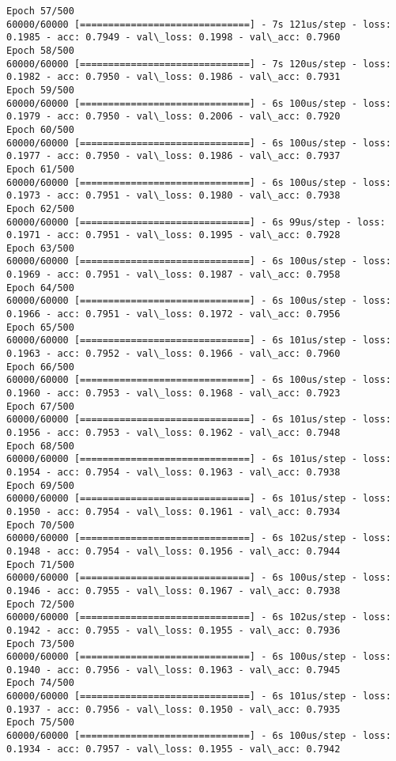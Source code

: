 \documentclass[11pt]{article}
\begin{document}
\begin{Verbatim}[commandchars=\\\{\}]
Epoch 57/500
60000/60000 [==============================] - 7s 121us/step - loss: 0.1985 - acc: 0.7949 - val\_loss: 0.1998 - val\_acc: 0.7960
Epoch 58/500
60000/60000 [==============================] - 7s 120us/step - loss: 0.1982 - acc: 0.7950 - val\_loss: 0.1986 - val\_acc: 0.7931
Epoch 59/500
60000/60000 [==============================] - 6s 100us/step - loss: 0.1979 - acc: 0.7950 - val\_loss: 0.2006 - val\_acc: 0.7920
Epoch 60/500
60000/60000 [==============================] - 6s 100us/step - loss: 0.1977 - acc: 0.7950 - val\_loss: 0.1986 - val\_acc: 0.7937
Epoch 61/500
60000/60000 [==============================] - 6s 100us/step - loss: 0.1973 - acc: 0.7951 - val\_loss: 0.1980 - val\_acc: 0.7938
Epoch 62/500
60000/60000 [==============================] - 6s 99us/step - loss: 0.1971 - acc: 0.7951 - val\_loss: 0.1995 - val\_acc: 0.7928
Epoch 63/500
60000/60000 [==============================] - 6s 100us/step - loss: 0.1969 - acc: 0.7951 - val\_loss: 0.1987 - val\_acc: 0.7958
Epoch 64/500
60000/60000 [==============================] - 6s 100us/step - loss: 0.1966 - acc: 0.7951 - val\_loss: 0.1972 - val\_acc: 0.7956
Epoch 65/500
60000/60000 [==============================] - 6s 101us/step - loss: 0.1963 - acc: 0.7952 - val\_loss: 0.1966 - val\_acc: 0.7960
Epoch 66/500
60000/60000 [==============================] - 6s 100us/step - loss: 0.1960 - acc: 0.7953 - val\_loss: 0.1968 - val\_acc: 0.7923
Epoch 67/500
60000/60000 [==============================] - 6s 101us/step - loss: 0.1956 - acc: 0.7953 - val\_loss: 0.1962 - val\_acc: 0.7948
Epoch 68/500
60000/60000 [==============================] - 6s 101us/step - loss: 0.1954 - acc: 0.7954 - val\_loss: 0.1963 - val\_acc: 0.7938
Epoch 69/500
60000/60000 [==============================] - 6s 101us/step - loss: 0.1950 - acc: 0.7954 - val\_loss: 0.1961 - val\_acc: 0.7934
Epoch 70/500
60000/60000 [==============================] - 6s 102us/step - loss: 0.1948 - acc: 0.7954 - val\_loss: 0.1956 - val\_acc: 0.7944
Epoch 71/500
60000/60000 [==============================] - 6s 100us/step - loss: 0.1946 - acc: 0.7955 - val\_loss: 0.1967 - val\_acc: 0.7938
Epoch 72/500
60000/60000 [==============================] - 6s 102us/step - loss: 0.1942 - acc: 0.7955 - val\_loss: 0.1955 - val\_acc: 0.7936
Epoch 73/500
60000/60000 [==============================] - 6s 100us/step - loss: 0.1940 - acc: 0.7956 - val\_loss: 0.1963 - val\_acc: 0.7945
Epoch 74/500
60000/60000 [==============================] - 6s 101us/step - loss: 0.1937 - acc: 0.7956 - val\_loss: 0.1950 - val\_acc: 0.7935
Epoch 75/500
60000/60000 [==============================] - 6s 100us/step - loss: 0.1934 - acc: 0.7957 - val\_loss: 0.1955 - val\_acc: 0.7942

\end{Verbatim}
\end{document}
